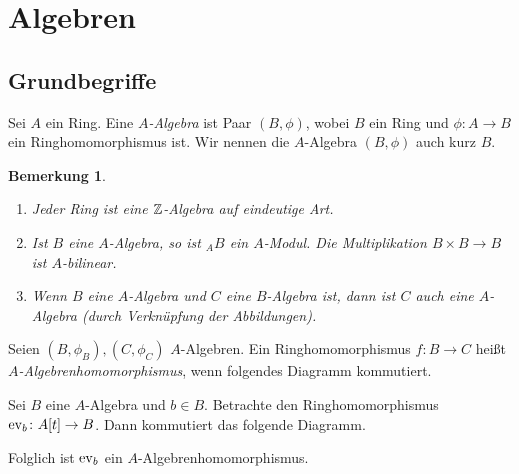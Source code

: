 \documentclass[12pt,a4paper]{scrartcl}
\theoremstyle{cplain}
\theoremstyle{cdef}
\newtheorem{beme}[thmcounter]{Bemerkung}
\begin{document}

\section{Algebren}
\subsection{Grundbegriffe}
\begin{defi}
	Sei $A$ ein Ring. Eine \emph{$A$-Algebra} ist Paar $(B,\phi)$, wobei $B$ ein Ring und $\phi\colon A\to B$ ein Ringhomomorphismus ist. Wir nennen die $A$-Algebra $(B,\phi)$ auch kurz $B$.
\end{defi}
\begin{beme}
	\leavevmode
	\begin{enumerate}
		\item Jeder Ring ist eine $\mathbb Z$-Algebra auf eindeutige Art.
		\item Ist $B$ eine $A$-Algebra, so ist ${}_AB$ ein $A$-Modul. Die Multiplikation $B\times B\to B$ ist $A$-bilinear.
		\item Wenn $B$ eine $A$-Algebra und $C$ eine $B$-Algebra ist, dann ist $C$ auch eine $A$-Algebra (durch Verknüpfung der Abbildungen).
	\end{enumerate}
\end{beme}
\begin{defi}
	Seien $(B, \phi_B),(C,\phi_C)$ $A$-Algebren. Ein Ringhomomorphismus $f\colon B\to C$ heißt \emph{$A$-Algebrenhomomorphismus}, wenn folgendes Diagramm kommutiert.
	\begin{figure}[H]
		\centering
	\end{figure}
\end{defi}
\begin{bsp}
	Sei $B$ eine $A$-Algebra und $b\in B$. Betrachte den Ringhomomorphismus $\operatorname{ev}_b\colon A[t]\to B$. Dann kommutiert das folgende Diagramm.
	\begin{figure}[H]
		\centering
	\end{figure}
	Folglich ist $\operatorname{ev}_b$ ein $A$-Algebrenhomomorphismus.
\end{bsp}
\end{document}
